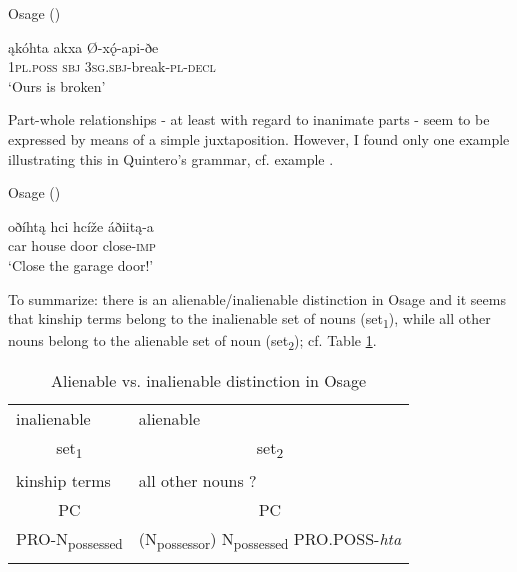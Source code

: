 \documentclass[output=paper]{LSP/langsci}
\begin{document}
\ea	Osage (\citealt[413]{Quintero2004}) \label{osagebroken}

\gll ąkóhta     akxa     Ø-xǫ́-api-ðe \\
\textsc{1pl.poss} \textsc{sbj} \textsc{3sg.sbj}-break-\textsc{pl-decl} \\
\glt `Ours is broken'
\z 

Part-whole relationships - at least with regard to inanimate parts - seem to be expressed by means of a simple juxtaposition. However, I found only one example illustrating this in Quintero's grammar, cf. example .

\ea	Osage (\citealt[423]{Quintero2004}) \label{osagegarage}

\gll oðíhtą hci      hcíže áðiitą-a \\
car       house door close-\textsc{imp} \\
\glt `Close the garage door!'
\z

To summarize: there is an alienable/inalienable distinction in Osage and it seems that kinship terms belong to the inalienable set of nouns (set\textsubscript{1}), while all other nouns belong to the alienable set of noun (set\textsubscript{2}); cf. Table \ref{osagealienability}.

\begin{table}
\caption{Alienable vs. inalienable distinction in Osage} \label{osagealienability}
\begin{tabular}{ l l }
\lsptoprule
inalienable & alienable \\
 \multicolumn{1}{c}{set\textsubscript{1}} &  \multicolumn{1}{c}{set\textsubscript{2}} \\
\midrule
 
kinship terms & 	all other nouns ? \\
\midrule
 \multicolumn{1}{c}{PC}	&  \multicolumn{1}{c}{PC} \\
\midrule
PRO-N\textsubscript{possessed} & (N\textsubscript{possessor}) N\textsubscript{possessed} PRO.POSS-\textit{hta} \\
\lspbottomrule
\end{tabular}
\end{table}
\end{document}
